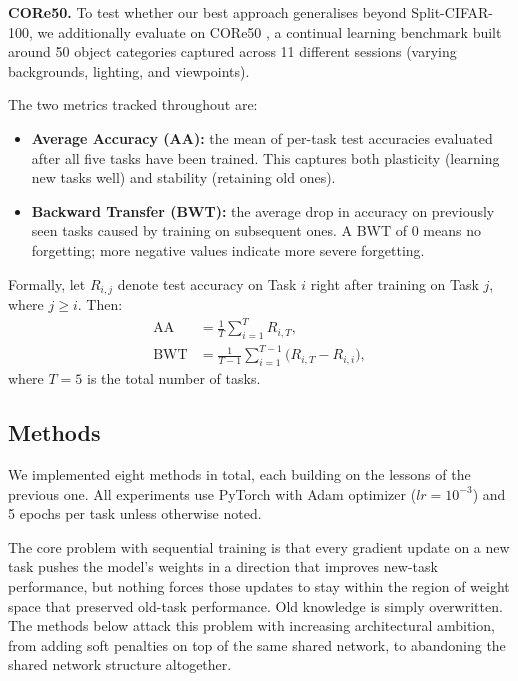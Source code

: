 \documentclass{article}
\begin{document}
\textbf{CORe50.} To test whether our best approach generalises beyond
Split-CIFAR-100, we additionally evaluate on CORe50 \citep{lomonaco2017core50},
a continual learning benchmark built around 50 object categories captured across
11 different sessions (varying backgrounds, lighting, and viewpoints). 

The two metrics tracked throughout are:
\begin{itemize}[leftmargin=*]
  \item \textbf{Average Accuracy (AA):} the mean of per-task test accuracies
    evaluated after all five tasks have been trained. This captures both
    plasticity (learning new tasks well) and stability (retaining old ones).
  \item \textbf{Backward Transfer (BWT):} the average drop in accuracy on
    previously seen tasks caused by training on subsequent ones. A BWT of 0
    means no forgetting; more negative values indicate more severe forgetting.
\end{itemize}

Formally, let $R_{i,j}$ denote test accuracy on Task $i$ right after training
on Task $j$, where $j \geq i$. Then:
\begin{align}
  \text{AA}  &= \frac{1}{T} \sum_{i=1}^{T} R_{i,T}, \\[4pt]
  \text{BWT} &= \frac{1}{T-1} \sum_{i=1}^{T-1}
               \bigl(R_{i,T} - R_{i,i}\bigr),
\end{align}
where $T = 5$ is the total number of tasks.

\subsection{Methods}
\label{sec:methods}

We implemented eight methods in total, each building on the lessons of the
previous one. All experiments use PyTorch with Adam optimizer ($lr = 10^{-3}$)
and 5 epochs per task unless otherwise noted.

The core problem with sequential training is that every gradient update on a
new task pushes the model's weights in a direction that improves new-task
performance, but nothing forces those updates to stay within the region of
weight space that preserved old-task performance. Old knowledge is simply
overwritten. The methods below attack this problem with increasing architectural
ambition, from adding soft penalties on top of the same shared network, to
abandoning the shared network structure altogether.
\end{document}
